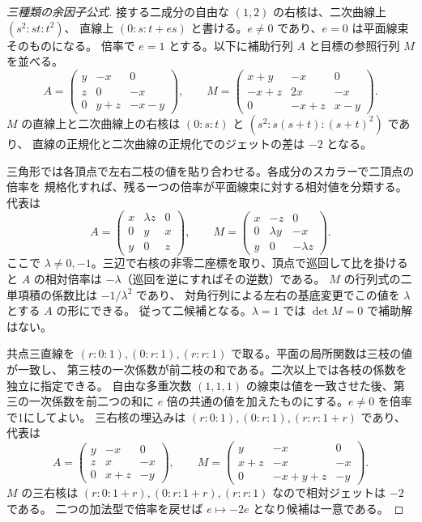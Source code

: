 \begin{proof}[三種類の余因子公式]
接する二成分の自由な $(1,2)$ の右核は、二次曲線上 $(s^2:st:t^2)$、
直線上 $(0:s:t+e s)$ と書ける。$e\ne0$ であり、$e=0$ は平面線束そのものになる。
倍率で $e=1$ とする。以下に補助行列 $A$ と目標の参照行列 $M$ を並べる。
\[
 A=\begin{pmatrix}y&-x&0\\z&0&-x\\0&y+z&-x-y\end{pmatrix},
 \qquad M=\begin{pmatrix}x+y&-x&0\\-x+z&2x&-x\\0&-x+z&x-y\end{pmatrix}.
\]
$M$ の直線上と二次曲線上の右核は $(0:s:t)$ と $(s^2:s(s+t):(s+t)^2)$ であり、
直線の正規化と二次曲線の正規化でのジェットの差は $-2$ となる。

三角形では各頂点で左右二枝の値を貼り合わせる。各成分のスカラーで二頂点の倍率を
規格化すれば、残る一つの倍率が平面線束に対する相対値を分類する。代表は
\[
 A=\begin{pmatrix}x&\lambda z&0\\0&y&x\\y&0&z\end{pmatrix},
 \qquad M=\begin{pmatrix}x&-z&0\\0&\lambda y&-x\\y&0&-\lambda z\end{pmatrix}.
\]
ここで $\lambda\ne0,-1$。三辺で右核の非零二座標を取り、頂点で巡回して比を掛けると
$A$ の相対倍率は $-\lambda$（巡回を逆にすればその逆数）である。
$M$ の行列式の二単項積の係数比は $-1/\lambda^2$ であり、
対角行列による左右の基底変更でこの値を $\lambda$ とする $A$ の形にできる。
従って二候補となる。$\lambda=1$ では $\det M=0$ で補助解はない。

共点三直線を $(r:0:1),(0:r:1),(r:r:1)$ で取る。平面の局所関数は三枝の値が一致し、
第三枝の一次係数が前二枝の和である。二次以上では各枝の係数を独立に指定できる。
自由な多重次数 $(1,1,1)$ の線束は値を一致させた後、第三の一次係数を前二つの和に
$e$ 倍の共通の値を加えたものにする。$e\ne0$ を倍率で1にしてよい。
三右核の埋込みは $(r:0:1),(0:r:1),(r:r:1+r)$ であり、代表は
\[
 A=\begin{pmatrix}y&-x&0\\z&x&-x\\0&x+z&-y\end{pmatrix},
 \qquad M=\begin{pmatrix}y&-x&0\\x+z&-x&-x\\0&-x+y+z&-y\end{pmatrix}.
\]
$M$ の三右核は $(r:0:1+r),(0:r:1+r),(r:r:1)$ なので相対ジェットは $-2$ である。
二つの加法型で倍率を戻せば $e\mapsto-2e$ となり候補は一意である。


\end{proof}
